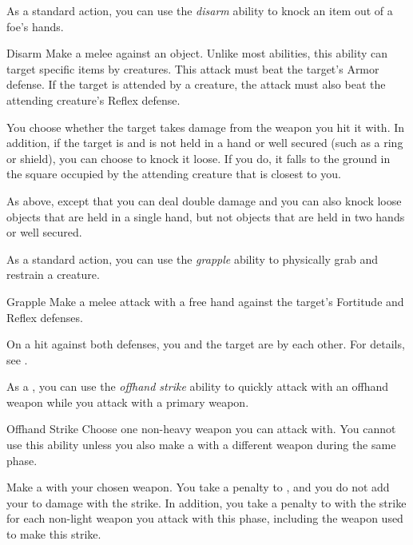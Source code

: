          As a standard action, you can use the \textit{disarm} ability to knock an item out of a foe's hands.

        \begin{freeability}{Disarm}\label{Disarm}
            Make a melee  against an object.
            Unlike most abilities, this ability can target specific items  by creatures.
            This attack must beat the target's Armor defense.
            If the target is attended by a creature, the attack must also beat the attending creature's Reflex defense.

            \hit You choose whether the target takes damage from the weapon you hit it with.
            In addition, if the target is  and is not held in a hand or well secured (such as a ring or shield), you can choose to knock it loose.
            If you do, it falls to the ground in the square occupied by the attending creature that is closest to you.

            \crit As above, except that you can deal double damage and you can also knock loose objects that are held in a single hand, but not objects that are held in two hands or well secured.
        \end{freeability}

         As a standard action, you can use the \textit{grapple} ability to physically grab and restrain a creature.

        \begin{freeability}{Grapple}\label{Grapple}
            Make a melee attack with a free hand against the target's Fortitude and Reflex defenses.

            On a hit against both defenses, you and the target are \grappled by each other.
            For details, see .
        \end{freeability}

        \label{Offhand Strike} As a , you can use the \textit{offhand strike} ability to quickly attack with an offhand weapon while you attack with a primary weapon.
        \begin{freeability}{Offhand Strike}
            Choose one non-heavy weapon you can attack with.
            You cannot use this ability unless you also make a  with a different weapon during the same phase.

            Make a  with your chosen weapon.
            You take a  penalty to , and you do not add your  to damage with the strike.
            In addition, you take a  penalty to  with the strike for each non-light weapon you attack with this phase, including the weapon used to make this strike.
        \end{freeability}

